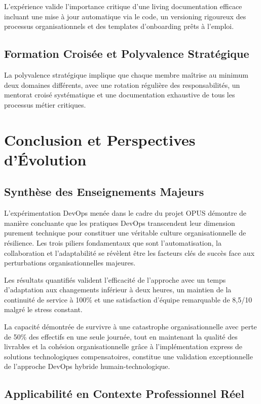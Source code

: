 \documentclass[12pt,a4paper]{article}
\begin{document}
L'expérience valide l'importance critique d'une living documentation efficace incluant une mise à jour automatique via le code, un versioning rigoureux des processus organisationnels et des templates d'onboarding prêts à l'emploi.

\subsection{Formation Croisée et Polyvalence Stratégique}

La polyvalence stratégique implique que chaque membre maîtrise au minimum deux domaines différents, avec une rotation régulière des responsabilités, un mentorat croisé systématique et une documentation exhaustive de tous les processus métier critiques.

\section{Conclusion et Perspectives d'Évolution}

\subsection{Synthèse des Enseignements Majeurs}

L'expérimentation DevOps menée dans le cadre du projet OPUS démontre de manière concluante que les pratiques DevOps transcendent leur dimension purement technique pour constituer une véritable culture organisationnelle de résilience. Les trois piliers fondamentaux que sont l'automatisation, la collaboration et l'adaptabilité se révèlent être les facteurs clés de succès face aux perturbations organisationnelles majeures.

Les résultats quantifiés valident l'efficacité de l'approche avec un temps d'adaptation aux changements inférieur à deux heures, un maintien de la continuité de service à 100\% et une satisfaction d'équipe remarquable de 8,5/10 malgré le stress constant.

La capacité démontrée de survivre à une catastrophe organisationnelle avec perte de 50\% des effectifs en une seule journée, tout en maintenant la qualité des livrables et la cohésion organisationnelle grâce à l'implémentation express de solutions technologiques compensatoires, constitue une validation exceptionnelle de l'approche DevOps hybride humain-technologique.

\subsection{Applicabilité en Contexte Professionnel Réel}
\end{document}
